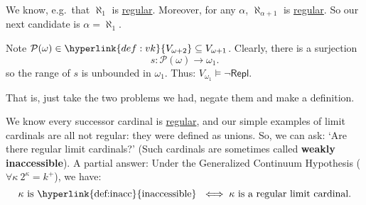 \documentclass{article}
\newcommand{\named}[1]{\textbf{#1}\index{#1}}
\newcommand{\1}{\mathbbm{1}}
\let\models\vDash
\begin{document}
We know, e.g.\ that $\aleph_1$ is \hyperlink{def:reg}{regular}. Moreover, for any $\alpha$, $\aleph_{\alpha+1}$ is \hyperlink{def:reg}{regular}.
So our next candidate is $\alpha = \aleph_1$.

\begin{center}
\end{center}
Note $\mathcal{P}(\omega) \in \hyperlink{def:vk}{V_{\omega+2}} \subseteq V_{\omega+1}$.
Clearly, there is a surjection
\begin{equation*}
  s: \mathcal{P}(\omega) \to \omega_1.
\end{equation*}
so the range of $s$ is unbounded in $\omega_1$.
Thus: $V_{\omega_1} \models \neg\textsf{Repl}$.

That is, just take the two problems we had, negate them and make a definition.

\begin{remark}
  We know every successor cardinal is \hyperlink{def:reg}{regular}, and our simple examples of limit cardinals are all not regular: they were defined as unions.
  So, we can ask: `Are there regular limit cardinals?'
  (Such cardinals are sometimes called \named{weakly inaccessible}).
  A partial answer: Under the Generalized Continuum Hypothesis ($\forall \kappa\ 2^\kappa = k^+$), we have:
  \begin{equation*}
    \kappa \text{ is \hyperlink{def:inacc}{inaccessible} } \iff \kappa \text{ is a regular limit cardinal}.
  \end{equation*}
\end{remark}
\end{document}
